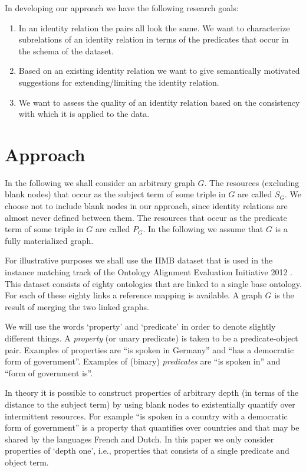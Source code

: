 \documentclass[letterpaper]{article}
\begin{document}
In developing our approach we have the following research goals:
\begin{enumerate}
\item In an identity relation the pairs all look the same.
      We want to characterize subrelations of an identity relation in terms
      of the predicates that occur in the schema of the dataset.
\item Based on an existing identity relation we want to give semantically
      motivated suggestions for extending/limiting the identity relation.
\item We want to assess the quality of an identity relation based on
      the consistency with which it is applied to the data.
\end{enumerate}

\section{Approach}
\label{sec:approach}

In the following we shall consider an arbitrary graph $G$.
The resources (excluding blank nodes) that occur as the subject term
  of some triple in $G$ are called $S_G$.
We choose not to include blank nodes in our approach,
  since identity relations are almost never defined between them.
The resources that occur as the predicate term of some triple in $G$
  are called $P_G$.
In the following we assume that $G$ is a fully materialized graph.

For illustrative purposes we shall use the IIMB dataset that is used
  in the instance matching track of the Ontology Alignment Evaluation
  Initiative 2012 \cite{oaei_2012}.
This dataset consists of eighty ontologies that are linked to a single base
  ontology.
For each of these eighty links a reference mapping is available.
A graph $G$ is the result of merging the two linked graphs.

We will use the words `property' and `predicate' in order to denote
  slightly different things.
A \emph{property} (or unary predicate) is taken to be a predicate-object pair.
Examples of properties are ``is spoken in Germany'' and
  ``has a democratic form of government''.
Examples of (binary) \emph{predicates} are ``is spoken in'' and
  ``form of government is''.

In theory it is possible to construct properties of arbitrary depth
  (in terms of the distance to the subject term) by using blank nodes
  to existentially quantify over intermittent resources.
For example ``is spoken in a country with a democratic form of government''
  is a property that quantifies over countries and that may be shared by
  the languages French and Dutch.
In this paper we only consider properties of `depth one',
  i.e., properties that consists of a single predicate and object term.
\end{document}
